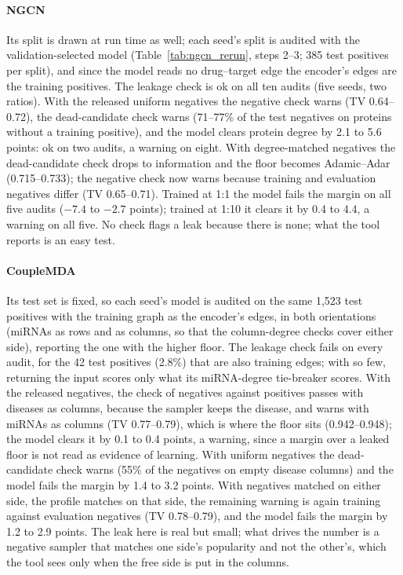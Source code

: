 \documentclass[review]{elsarticle}
\begin{document}
\paragraph{NGCN} Its split is drawn at run time as well; each seed's split is audited with the validation-selected
model (Table~\ref{tab:ngcn_rerun}, steps 2--3; 385 test positives per split), and since the model reads no
drug--target edge the encoder's edges are the training positives. The leakage check is ok on all ten audits
(five seeds, two ratios). With the released uniform negatives the negative check warns (TV 0.64--0.72), the
dead-candidate check warns (71--77\% of the test negatives on proteins without a training positive), and the
model clears protein degree by 2.1 to 5.6 points: ok on two audits, a warning on eight. With degree-matched
negatives the dead-candidate check drops to information and the floor becomes Adamic--Adar (0.715--0.733);
the negative check now warns because training and evaluation negatives differ (TV 0.65--0.71). Trained at 1:1
the model fails the margin on all five audits ($-7.4$ to $-2.7$ points); trained at 1:10 it clears it by 0.4
to 4.4, a warning on all five. No check flags a leak because there is none; what the tool reports is an easy
test.

\paragraph{CoupleMDA} Its test set is fixed, so each seed's model is audited on the same 1,523 test positives
with the training graph as the encoder's edges, in both orientations (miRNAs as rows and as columns, so that the
column-degree checks cover either side), reporting the one with the higher floor. The leakage check fails on
every audit, for the 42 test positives (2.8\%) that are also training edges; with so few, returning the input
scores only what its miRNA-degree tie-breaker scores. With the released negatives, the check of negatives against
positives passes with diseases as columns, because the sampler keeps the disease, and warns with miRNAs as
columns (TV 0.77--0.79), which is where the floor sits (0.942--0.948); the model clears it by 0.1 to 0.4 points, a
warning, since a margin over a leaked floor is not read as evidence of learning. With uniform negatives the
dead-candidate check warns (55\% of the negatives on empty disease columns) and the model fails the margin by 1.4
to 3.2 points. With negatives matched on either side, the profile matches on that side, the remaining warning is
again training against evaluation negatives (TV 0.78--0.79), and the model fails the margin by 1.2 to 2.9 points.
The leak here is real but small; what drives the number is a negative sampler that matches one side's popularity
and not the other's, which the tool sees only when the free side is put in the columns.
\end{document}
